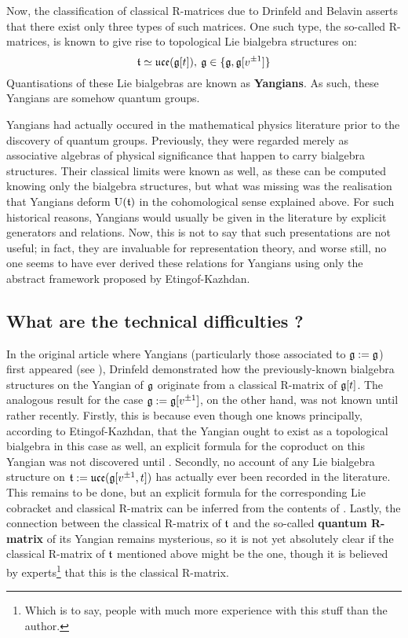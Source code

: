         Now, the classification of classical R-matrices due to Drinfeld and Belavin asserts that there exist only three types of such matrices. One such type, the so-called  R-matrices, is known to give rise to topological Lie bialgebra structures on:
            $$\mathfrak{t} \simeq \mathfrak{uce}( \mathfrak{g}[t] ), \: \mathfrak{g} \in \{\mathfrak{g}, \mathfrak{g}[v^{\pm 1}]\}$$
        Quantisations of these Lie bialgebras are known as \textbf{Yangians}. As such, these Yangians are somehow  quantum groups.

        Yangians had actually occured in the mathematical physics literature prior to the discovery of quantum groups. Previously, they were regarded merely as associative algebras of physical significance that happen to carry bialgebra structures. Their classical limits were known as well, as these can be computed knowing only the bialgebra structures, but what was missing was the realisation that Yangians deform $\mathrm{U}(\mathfrak{t})$ in the cohomological sense explained above. For such historical reasons, Yangians would usually be given in the literature by explicit generators and relations. Now, this is not to say that such presentations are not useful; in fact, they are invaluable for representation theory, and worse still, no one seems to have ever derived these relations for Yangians using only the abstract framework proposed by Etingof-Kazhdan. 

    \subsection{What are the technical difficulties ?}
        In the original article where Yangians (particularly those associated to $\mathfrak{g} := \mathfrak{g}$) first appeared (see \cite{drinfeld_original_yangian_paper}), Drinfeld demonstrated how the previously-known bialgebra structures on the Yangian of $\mathfrak{g}$ originate from a classical R-matrix of $\mathfrak{g}[t]$. The analogous result for the case $\mathfrak{g} := \mathfrak{g}[v^{\pm 1}]$, on the other hand, was not known until rather recently. Firstly, this is because even though one knows principally, according to Etingof-Kazhdan, that the Yangian ought to exist as a topological bialgebra in this case as well, an explicit formula for the coproduct on this Yangian was not discovered until \cite{guay_nakajima_wendlandt_affine_yangian_coproduct}. Secondly, no account of any Lie bialgebra structure on $\mathfrak{t} := \mathfrak{uce}(\mathfrak{g}[v^{\pm 1}, t])$ has actually ever been recorded in the literature. This remains to be done, but an explicit formula for the corresponding Lie cobracket and classical R-matrix can be inferred from the contents of \cite[Chapter 3]{msc_thesis_gamma_extended_toroidal_lie_algebras}. Lastly, the connection between the classical R-matrix of $\mathfrak{t}$ and the so-called \textbf{quantum R-matrix} of its Yangian remains mysterious, so it is not yet absolutely clear if the classical R-matrix of $\mathfrak{t}$ mentioned above might be the  one, though it is believed by experts\footnote{Which is to say, people with much more experience with this stuff than the author.} that this is the  classical R-matrix.

